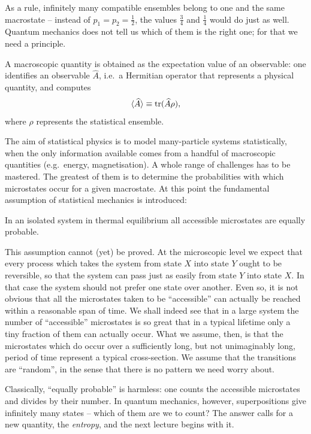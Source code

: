 As a rule, infinitely many compatible ensembles belong to one and the same macrostate -- instead of $p_1 = p_2 = \frac12$, the values $\frac34$ and $\frac14$ would do just as well. Quantum mechanics does not tell us which of them is the right one; for that we need a principle.

A macroscopic quantity is obtained as the expectation value of an observable: one identifies an observable $\widehat{A}$, i.e.\ a Hermitian operator that represents a physical quantity, and computes
\begin{equation}
  \langle \widehat{A}\rangle \equiv \operatorname{tr}(\widehat{A} \rho),
\end{equation} 
where $\rho$ represents the statistical ensemble.

The aim of statistical physics is to model many-particle systems statistically, when the only information available comes from a handful of macroscopic quantities (e.g.\ energy, magnetisation). A whole range of challenges has to be mastered. The greatest of them is to determine the probabilities with which microstates occur for a given macrostate. At this point the fundamental assumption of statistical mechanics is introduced:
\begin{center}
\parbox[c][5cm][c]{14cm}{\begin{tcolorbox}[colback=banana,arc=0cm,frame hidden,enhanced]{In an isolated system in thermal equilibrium all accessible microstates are equally probable.}\end{tcolorbox}}
\end{center}

This assumption cannot (yet) be proved. At the microscopic level we expect that every process which takes the system from state $X$ into state $Y$ ought to be reversible, so that the system can pass just as easily from state $Y$ into state $X$. In that case the system should not prefer one state over another. Even so, it is not obvious that all the microstates taken to be ``accessible'' can actually be reached within a reasonable span of time. We shall indeed see that in a large system the number of ``accessible'' microstates is so great that in a typical lifetime only a tiny fraction of them can actually occur. What we assume, then, is that the microstates which do occur over a sufficiently long, but not unimaginably long, period of time represent a typical cross-section. We assume that the transitions are ``random'', in the sense that there is no pattern we need worry about.

Classically, ``equally probable'' is harmless: one counts the accessible microstates and divides by their number. In quantum mechanics, however, superpositions give infinitely many states -- which of them are we to count? The answer calls for a new quantity, the \emph{entropy}, and the next lecture begins with it.
